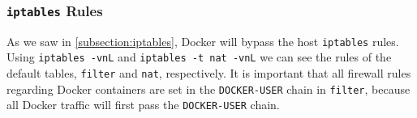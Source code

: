 \subsubsection{\texorpdfstring{\lstinline{iptables}}{iptables} Rules}
As we saw in \autoref{subsection:iptables}, Docker will bypass the host \lstinline{iptables} rules. Using \lstinline{iptables -vnL} and \lstinline{iptables -t nat -vnL} we can see the rules of the default tables, \lstinline{filter} and \lstinline{nat}, respectively. It is important that all firewall rules regarding Docker containers are set in the \lstinline{DOCKER-USER} chain in \lstinline{filter}, because all Docker traffic will first pass the \lstinline{DOCKER-USER} chain.
